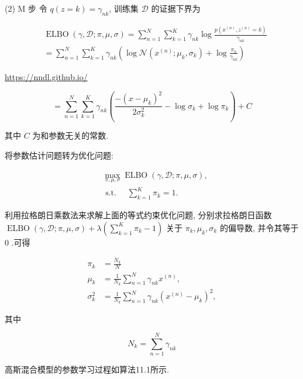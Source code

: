 \documentclass[10pt]{article}
\begin{document}
(2) $\mathrm{M}$ 步 令 $q(z=k)=\gamma_{n k}$, 训练集 $\mathcal{D}$ 的证据下界为


\begin{align*}
& \operatorname{ELBO}(\gamma, \mathcal{D} ; \pi, \mu, \sigma)=\sum_{n=1}^{N} \sum_{k=1}^{K} \gamma_{n k} \log \frac{p\left(x^{(n)}, z^{(n)}=k\right)}{\gamma_{n k}}  \tag{11.59}\\
& =\sum_{n=1}^{N} \sum_{k=1}^{K} \gamma_{n k}\left(\log \mathcal{N}\left(x^{(n)} ; \mu_{k}, \sigma_{k}\right)+\log \frac{\pi_{k}}{\gamma_{n k}}\right) \tag{11.60}
\end{align*}


\href{https://nndl.github.io/}{https://nndl.github.io/}


\begin{equation*}
=\sum_{n=1}^{N} \sum_{k=1}^{K} \gamma_{n k}\left(\frac{-\left(x-\mu_{k}\right)^{2}}{2 \sigma_{k}^{2}}-\log \sigma_{k}+\log \pi_{k}\right)+C \tag{11.61}
\end{equation*}


其中 $C$ 为和参数无关的常数.

将参数估计问题转为优化问题:


\begin{align*}
& \max _{\pi, \mu, \sigma} \operatorname{ELBO}(\gamma, \mathcal{D} ; \pi, \mu, \sigma),  \tag{11.62}\\
& \text { s.t. } \quad \sum_{k=1}^{K} \pi_{k}=1 .
\end{align*}


利用拉格朗日乘数法来求解上面的等式约束优化问题, 分别求拉格朗日函数 $\operatorname{ELBO}(\gamma, \mathcal{D} ; \pi, \mu, \sigma)+\lambda\left(\sum_{k=1}^{K} \pi_{k}-1\right)$ 关于 $\pi_{k}, \mu_{k}, \sigma_{k}$ 的偏导数, 并令其等于 0 .可得


\begin{align*}
\pi_{k} & =\frac{N_{k}}{N}  \tag{11.63}\\
\mu_{k} & =\frac{1}{N_{k}} \sum_{n=1}^{N} \gamma_{n k} x^{(n)},  \tag{11.64}\\
\sigma_{k}^{2} & =\frac{1}{N_{k}} \sum_{n=1}^{N} \gamma_{n k}\left(x^{(n)}-\mu_{k}\right)^{2}, \tag{11.65}
\end{align*}


其中


\begin{equation*}
N_{k}=\sum_{n=1}^{N} \gamma_{n k} \tag{11.66}
\end{equation*}


高斯混合模型的参数学习过程如算法11.1所示.
\end{document}
